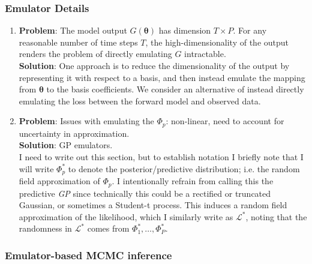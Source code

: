 \documentclass[12pt]{article}
\newcommand{\btheta}{\boldsymbol{\theta}}
\begin{document}
\subsubsection{Emulator Details}
\begin{enumerate}
\item \textbf{Problem}: The model output $G(\btheta)$ has dimension $T \times P$. For any reasonable number of time steps $T$, the high-dimensionality of the output renders the problem of directly emulating $G$ intractable.  \\
	\textbf{Solution}: One approach is to reduce the dimensionality of the output by representing it with respect to a basis, and then instead emulate the mapping from $\btheta$ to the basis coefficients. We consider an alternative 
	of instead directly emulating the loss between the forward model and observed data. 
	
\item \textbf{Problem}: Issues with emulating the $\Phi_p$: non-linear, need to account for uncertainty in approximation. \\
\textbf{Solution}: GP emulators. \\
I need to write out this section, but to establish notation I briefly note that I will write $\Phi_p^*$ to denote the posterior/predictive distribution; i.e. the random field approximation of $\Phi_p$. I intentionally refrain from calling 
this the predictive \textit{GP} since technically this could be a rectified or truncated Gaussian, or sometimes a Student-t process. This induces a random field approximation of the likelihood, which I similarly write as 
$\mathcal{L}^*$, noting that the randomness in $\mathcal{L}^*$ comes from $\Phi^*_1, \dots, \Phi^*_P$. 
	
\end{enumerate}

\subsubsection{Emulator-based MCMC inference}
\end{document}
